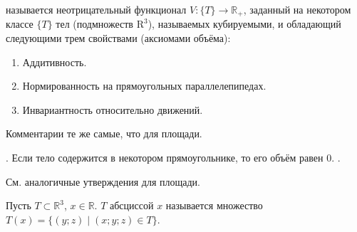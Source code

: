 \documentclass{article}
\begin{document}
\begin{itemize}
\begin{Example}
        \end{Example}
        \dfn {} называется неотрицательный функционал $V\colon\{T\}\to\mathbb R_+$, заданный на некотором классе $\{T\}$ тел (подмножеств $\mathrm R^3$), называемых кубируемыми, и обладающий следующими трем свойствами (аксиомами объёма):
        \begin{enumerate}
            \item Аддитивность.
            \item Нормированность на прямоугольных параллелепипедах.
            \item Инвариантность относительно движений.
        \end{enumerate}
        \begin{Comment}
            Комментарии те же самые, что для площади.
        \end{Comment}
        \thm {}.
        \thm Если тело содержится в некотором прямоугольнике, то его объём равен 0.
        \thm {}.
        \begin{Comment}
            См. аналогичные утверждения для площади.
        \end{Comment}
        \dfn Пусть $T\subset\mathbb R^3$, $x\in\mathbb R$.  $T$ абсциссой $x$ называется множество $T(x)=\{(y;z)\mid(x;y;z)\in T\}$.
        \begin{Comment}
            \begin{center}
\end{center}
\end{Comment}
\end{itemize}
\end{document}
